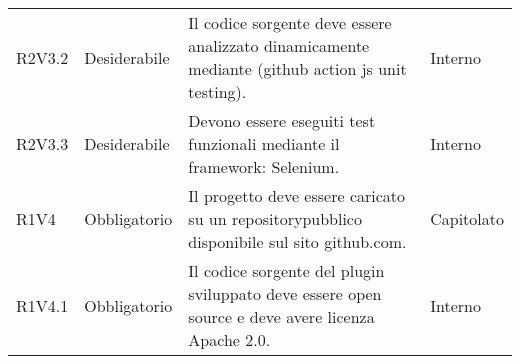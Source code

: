 \begin{longtable} {
		>{\centering}p{18mm} 
		>{\centering}p{28mm}
		>{}p{50mm} 
		>{}p{28mm}
		}
	R2V3.2 &
	Desiderabile &
	Il codice sorgente deve essere analizzato dinamicamente mediante (github action js unit testing). &
	Interno  \TBstrut \\ [2mm]
	
	R2V3.3 &
	Desiderabile &
	Devono essere eseguiti test funzionali mediante il framework: Selenium. &
	Interno  \TBstrut \\ [2mm]
	
	R1V4 & 
	Obbligatorio & 
	Il progetto deve essere caricato su un repository\glosp pubblico disponibile sul sito github.com. &
	Capitolato  \TBstrut \\ [2mm]
	
	R1V4.1 & 
	Obbligatorio & 
	Il codice sorgente del plugin sviluppato deve essere open source e deve avere licenza Apache 2.0\glo .  &
	Interno  \TBstrut \\ [2mm]
\end{longtable}
